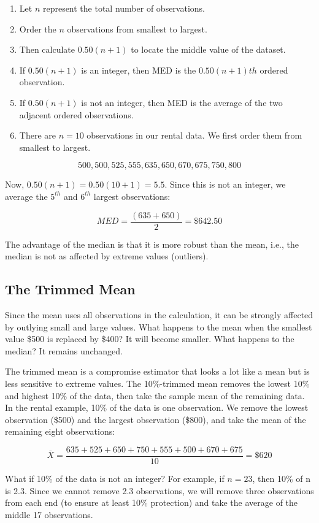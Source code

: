 \documentclass[11pt]{book}\usepackage[]{graphicx}\usepackage[]{color}
\begin{document}
\begin{enumerate}
\item Let $n$ represent the total number of observations.
\item Order the $n$ observations from smallest to largest.
\item Then calculate $0.50(n + 1)$ to locate the middle value of the dataset.
\item If $0.50(n + 1)$ is an integer, then MED is the $0.50(n + 1)th$ ordered observation.
\item If $0.50(n + 1)$ is not an integer, then MED is the average of the two adjacent ordered observations.
\item There are $n = 10$ observations in our rental data.  We first order them from smallest to largest.
\end{enumerate}

$$ 500, 500, 525, 555, 635, 650, 670, 675, 750, 800 $$

Now, $0.50(n + 1) = 0.50(10 + 1) = 5.5$.  Since this is not an integer, we average the $5^{th}$ and $6^{th}$ largest observations:

$$MED = \frac{(635 + 650)}{2} = \$642.50$$

The advantage of the median is that it is more robust than the mean, i.e., the median is not as affected by extreme values (outliers).

\subsection{The Trimmed Mean}

Since the mean uses all observations in the calculation, it can be strongly affected by outlying small and large values.  What happens to the mean when the smallest value \$500 is replaced by \$400?  It will become smaller.  What happens to the median?  It remains unchanged.

The trimmed mean is a compromise estimator that looks a lot like a mean but is less sensitive to extreme values.  The 10\%-trimmed mean removes the lowest 10\% and highest 10\% of the data, then take the sample mean of the remaining data.  In the rental example, 10\% of the data is one observation. We remove the lowest
observation (\$500) and the largest observation (\$800), and take the mean of the remaining eight observations:

$$\bar{X} = \frac{635+525+650+750+555+500+670+675}{10} = \$620$$

What if 10\% of the data is not an integer?  For example, if $n = 23$, then 10\% of n is 2.3.  Since we cannot remove 2.3 observations, we will remove three observations from each end (to ensure at least 10\% protection) and take the average of the middle 17 observations.
\end{document}
